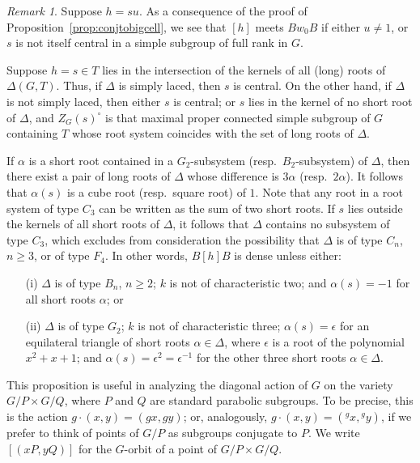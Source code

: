 \documentclass{amsart}
\theoremstyle{plain}
\theoremstyle{definition}
\theoremstyle{remark}
\newtheorem{remark}[theorem]{Remark}
\begin{document}
\begin{remark}\label{rem:conjtobigcell}
Suppose $h = su$. As a consequence of the proof of Proposition~\ref{prop:conjtobigcell},
we see that $[h]$ meets $Bw_{0}B$ if either $u \neq 1$, or $s$ is not itself central in
a simple subgroup of full rank in $G$.

Suppose $h = s \in T$ lies in the intersection of the kernels of all
(long) roots of $\Delta(G, T)$. Thus, if $\Delta$ is simply laced, then $s$ is central.
On the other hand, if $\Delta$ is not simply laced, then either $s$ is central; or $s$
lies in the kernel of no short root of $\Delta$, and $Z_{G}(s)^{\circ}$ is
that maximal proper connected simple subgroup of $G$ containing $T$
whose root system coincides with the set of long roots of $\Delta$.

If $\alpha$ is a
short root contained in a $G_{2}$-subsystem (resp.\ $B_{2}$-subsystem) of $\Delta$, then 
there exist a pair of long roots of $\Delta$ whose difference is $3\alpha$ (resp.\
$2\alpha$). It follows that $\alpha(s)$ is a cube root (resp.\ square root) of $1$. Note that any root in a root system of type $C_{3}$ can be written as the sum of two short roots.
If $s$ lies outside the kernels of all short roots of $\Delta$, it follows that $\Delta$
contains no subsystem of type $C_{3}$,
which excludes from consideration the possibility that $\Delta$ is of type $C_{n}$, $n
\geqslant 3$, or of type $F_{4}$. In other words, $B[h]B$ is dense unless 
either:
\begin{itemize}
\item[(i)] $\Delta$ is of type $B_{n}$, $n \geqslant 2$; $k$ is not of characteristic two;
and $\alpha(s) = -1$ for all short roots $\alpha$; or
\item[(ii)] $\Delta$ is of type $G_{2}$; $k$ is not of characteristic three; $\alpha(s) = \epsilon$ for an equilateral
triangle of short roots $\alpha \in \Delta$, where $\epsilon$
is a root of the polynomial $x^{2} + x + 1$; and $\alpha(s) = \epsilon^{2} = \epsilon^{-1}$ for the other three short roots
$\alpha \in \Delta$.
\end{itemize}
\end{remark}

This proposition is useful in analyzing
the diagonal action of $G$ on the variety $G/P \times G/Q$,
where $P$ and $Q$ are standard parabolic subgroups. To be precise, this is the action
$g\cdot (x, y) = (gx, gy)$; or, analogously, $g\cdot (x, y) = (\mbox{}^{g}x,
\mbox{}^{g}y)$, if we prefer to think of points of $G/P$ as subgroups conjugate to $P$.
We write $[(xP, yQ)]$ for the $G$-orbit of a point of $G/P \times G/Q$. 
\end{document}
